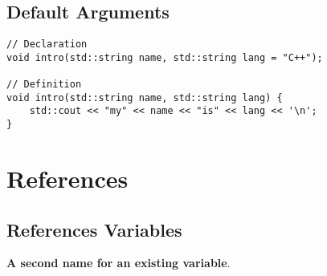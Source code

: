 \subsection{Default Arguments}

\begin{verbatim}
// Declaration
void intro(std::string name, std::string lang = "C++");

// Definition
void intro(std::string name, std::string lang) {
    std::cout << "my" << name << "is" << lang << '\n';
}
\end{verbatim}


\section{References}

\subsection{References Variables}

\textbf{A second name for an existing variable}.


